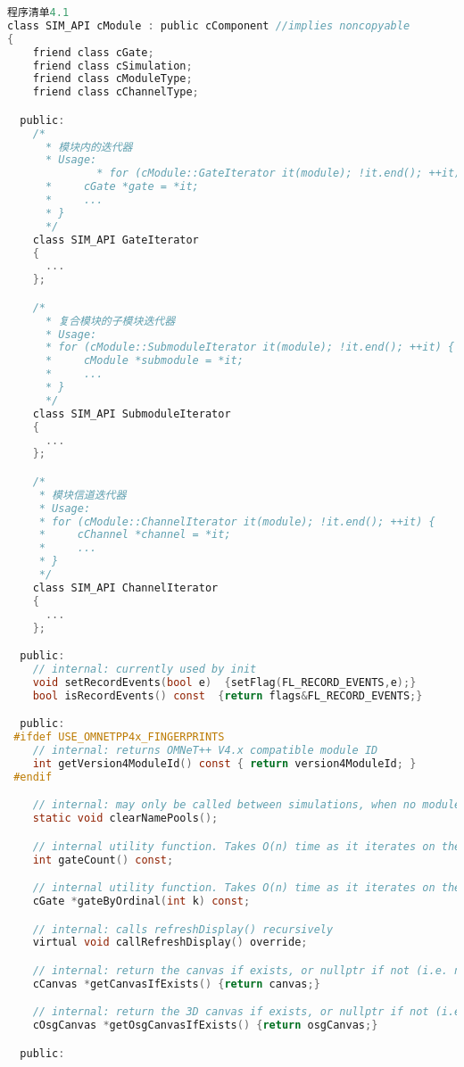\begin{lstlisting}[language=c,caption=My]
程序清单4.1
class SIM_API cModule : public cComponent //implies noncopyable
{
    friend class cGate;
    friend class cSimulation;
    friend class cModuleType;
    friend class cChannelType;

  public:
    /*
      * 模块内的迭代器
      * Usage:
              * for (cModule::GateIterator it(module); !it.end(); ++it) {
      *     cGate *gate = *it;
      *     ...
      * }
      */
    class SIM_API GateIterator
    {
      ...
    };

    /*
      * 复合模块的子模块迭代器
      * Usage:
      * for (cModule::SubmoduleIterator it(module); !it.end(); ++it) {
      *     cModule *submodule = *it;
      *     ...
      * }
      */
    class SIM_API SubmoduleIterator
    {
      ...
    };

    /*
     * 模块信道迭代器
     * Usage:
     * for (cModule::ChannelIterator it(module); !it.end(); ++it) {
     *     cChannel *channel = *it;
     *     ...
     * }
     */
    class SIM_API ChannelIterator
    {
      ...
    };

  public:
    // internal: currently used by init
    void setRecordEvents(bool e)  {setFlag(FL_RECORD_EVENTS,e);}
    bool isRecordEvents() const  {return flags&FL_RECORD_EVENTS;}

  public:
 #ifdef USE_OMNETPP4x_FINGERPRINTS
    // internal: returns OMNeT++ V4.x compatible module ID
    int getVersion4ModuleId() const { return version4ModuleId; }
 #endif

    // internal: may only be called between simulations, when no modules exist
    static void clearNamePools();

    // internal utility function. Takes O(n) time as it iterates on the gates
    int gateCount() const;

    // internal utility function. Takes O(n) time as it iterates on the gates
    cGate *gateByOrdinal(int k) const;

    // internal: calls refreshDisplay() recursively
    virtual void callRefreshDisplay() override;

    // internal: return the canvas if exists, or nullptr if not (i.e. no create-on-demand)
    cCanvas *getCanvasIfExists() {return canvas;}

    // internal: return the 3D canvas if exists, or nullptr if not (i.e. no create-on-demand)
    cOsgCanvas *getOsgCanvasIfExists() {return osgCanvas;}

  public:


\end{lstlisting}

